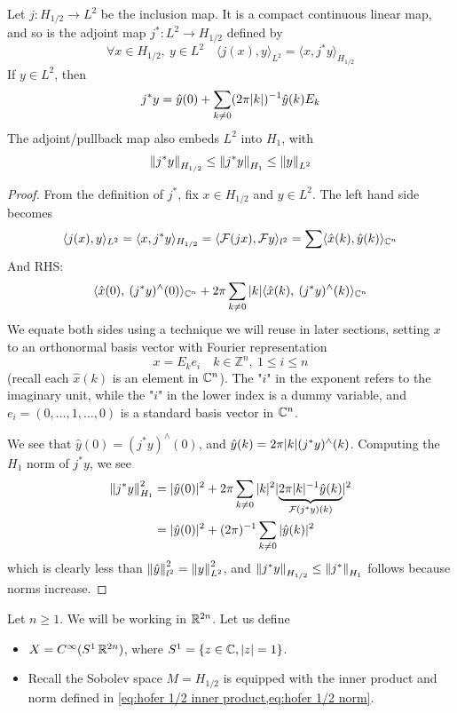 \documentclass[../main-v2-manifolds.tex]{subfiles}
\begin{document}
\begin{wts}
Let $j: H_{1/2}\to L^2$ be the inclusion map. It is a compact continuous linear map, and so is the adjoint map $j^*: L^2\to H_{1/2}$ defined by
\[
\forall x\in H_{1/2},\: y\in L^2\quad \langle j(x),y\rangle_{L^2} = \langle x,j^*y\rangle_{H_{1/2}}
\]
If $y\in L^2$, then
\[
j^*y = \hat{y}(0) + \sum_{k\neq 0}(2\pi\vert {k} \vert)^{-1}\hat{y}(k)E_k
\]
The adjoint/pullback map also embeds $L^2$ into $H_1$, with
\[
\norm{j^*y}_{H_{1/2}}\leq \norm{j^*y}_{H_1}\leq \norm{y}_{L^2}
\]
\end{wts}
\begin{proof}
From the definition of $j^*$, fix $x\in H_{1/2}$ and $y\in L^2$. The left hand side  becomes
\[
\langle j(x), y\rangle_{L^2} = \langle x,j^*y\rangle_{H_{1/2}} = \langle \mathcal{F}(jx),\mathcal{F} y\rangle_{l^2}= \sum \langle \hat{x}(k),\hat{y}(k)\rangle_{{\mathbb{C}}^n}
\]
And RHS:
\[
\langle \hat{x}(0),\:(j^*y)^{\wedge}(0)\rangle_{{\mathbb{C}}^n} + 2\pi\sum_{k\neq 0}\vert {k} \vert\langle \hat{x}(k),\: (j^*y)^{\wedge}(k)\rangle_{{\mathbb{C}}^n}
\]
We equate both sides using a technique we will reuse in later sections, setting $x$ to an orthonormal basis vector with Fourier representation 
\[
x = E_ke_i\quad k\in\mathbb{Z}^n,\: 1\leq i\leq n
\]
(recall each $\hat{x}(k)$ is an element in ${\mathbb{C}}^n$). The "$i$" in the exponent refers to the imaginary unit, while the "$i$" in the lower index is a dummy variable, and $e_i = (0,\ldots,1,\ldots,0)$ is a standard basis vector in ${\mathbb{C}}^n$.

We see that $\hat{y}(0) = (j^*y)^{\wedge}(0)$, and $\hat{y}(k)=2\pi \vert {k} \vert (j^*y)^{\wedge}(k)$. Computing the $H_{1}$ norm of $j^*y$, we see
\begin{align*}
\norm{j^*y}^2_{H_{1}} &= \vert \hat{y}(0)\vert^2 + 2\pi\sum_{k\neq 0}\vert {k} \vert^2\vert { \underbrace{2\pi\vert {k} \vert^{-1}\hat{y}(k)}_{\mathcal{F}(j^* y)(k)}} \vert^2\\
&= \vert \hat{y}(0)\vert^2 + (2\pi)^{-1}\sum_{k\neq 0}\vert \hat{y}(k)\vert^2
\end{align*}
which is clearly less than $\norm{\hat{y}}^2_{l^2} = \norm{y}^2_{L^2}$, and $\norm{j^*y}_{H_{1/2}}\leq \norm{j^*}_{H_1}$ follows because norms increase.
\end{proof}
%
%
%
%
%
\providecommand{\realtn}{{\real^{2n}}}
Let $n\geq 1$. We will be working in $\mathbb{R}^{2n}$. Let us define
\begin{itemize}
    \item $X = C^\infty(S^1\,\realtn)$, where $S^1 = \{z\in{\mathbb{C}}, \vert {z} \vert=1\}$.
    \item Recall the Sobolev space $M = H_{1/2}$ is equipped with the inner product and norm defined in \cref{eq:hofer 1/2 inner product,eq:hofer 1/2 norm}.
\end{itemize}
\end{document}
